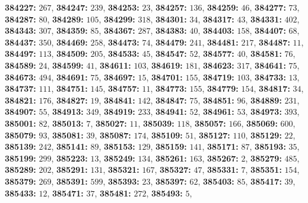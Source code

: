 \textsf{\bfseries 384227:} $267$, \textsf{\bfseries 384247:} $239$, \textsf{\bfseries 384253:} $23$, \textsf{\bfseries 384257:} $136$, \textsf{\bfseries 384259:} $46$, \textsf{\bfseries 384277:} $73$, \textsf{\bfseries 384287:} $80$, \textsf{\bfseries 384289:} $105$, \textsf{\bfseries 384299:} $318$, \textsf{\bfseries 384301:} $34$, \textsf{\bfseries 384317:} $43$, \textsf{\bfseries 384331:} $402$, \textsf{\bfseries 384343:} $307$, \textsf{\bfseries 384359:} $85$, \textsf{\bfseries 384367:} $287$, \textsf{\bfseries 384383:} $40$, \textsf{\bfseries 384403:} $158$, \textsf{\bfseries 384407:} $68$, \textsf{\bfseries 384437:} $350$, \textsf{\bfseries 384469:} $258$, \textsf{\bfseries 384473:} $74$, \textsf{\bfseries 384479:} $241$, \textsf{\bfseries 384481:} $217$, \textsf{\bfseries 384487:} $11$, \textsf{\bfseries 384497:} $113$, \textsf{\bfseries 384509:} $205$, \textsf{\bfseries 384533:} $45$, \textsf{\bfseries 384547:} $52$, \textsf{\bfseries 384577:} $40$, \textsf{\bfseries 384581:} $76$, \textsf{\bfseries 384589:} $24$, \textsf{\bfseries 384599:} $41$, \textsf{\bfseries 384611:} $103$, \textsf{\bfseries 384619:} $181$, \textsf{\bfseries 384623:} $317$, \textsf{\bfseries 384641:} $75$, \textsf{\bfseries 384673:} $494$, \textsf{\bfseries 384691:} $75$, \textsf{\bfseries 384697:} $15$, \textsf{\bfseries 384701:} $155$, \textsf{\bfseries 384719:} $103$, \textsf{\bfseries 384733:} $13$, \textsf{\bfseries 384737:} $111$, \textsf{\bfseries 384751:} $145$, \textsf{\bfseries 384757:} $11$, \textsf{\bfseries 384773:} $155$, \textsf{\bfseries 384779:} $154$, \textsf{\bfseries 384817:} $34$, \textsf{\bfseries 384821:} $176$, \textsf{\bfseries 384827:} $19$, \textsf{\bfseries 384841:} $142$, \textsf{\bfseries 384847:} $75$, \textsf{\bfseries 384851:} $96$, \textsf{\bfseries 384889:} $231$, \textsf{\bfseries 384907:} $55$, \textsf{\bfseries 384913:} $349$, \textsf{\bfseries 384919:} $233$, \textsf{\bfseries 384941:} $52$, \textsf{\bfseries 384961:} $53$, \textsf{\bfseries 384973:} $393$, \textsf{\bfseries 385001:} $82$, \textsf{\bfseries 385013:} $7$, \textsf{\bfseries 385027:} $11$, \textsf{\bfseries 385039:} $118$, \textsf{\bfseries 385057:} $166$, \textsf{\bfseries 385069:} $600$, \textsf{\bfseries 385079:} $93$, \textsf{\bfseries 385081:} $39$, \textsf{\bfseries 385087:} $174$, \textsf{\bfseries 385109:} $51$, \textsf{\bfseries 385127:} $110$, \textsf{\bfseries 385129:} $22$, \textsf{\bfseries 385139:} $242$, \textsf{\bfseries 385141:} $89$, \textsf{\bfseries 385153:} $129$, \textsf{\bfseries 385159:} $141$, \textsf{\bfseries 385171:} $87$, \textsf{\bfseries 385193:} $35$, \textsf{\bfseries 385199:} $299$, \textsf{\bfseries 385223:} $13$, \textsf{\bfseries 385249:} $134$, \textsf{\bfseries 385261:} $163$, \textsf{\bfseries 385267:} $2$, \textsf{\bfseries 385279:} $485$, \textsf{\bfseries 385289:} $202$, \textsf{\bfseries 385291:} $131$, \textsf{\bfseries 385321:} $167$, \textsf{\bfseries 385327:} $47$, \textsf{\bfseries 385331:} $7$, \textsf{\bfseries 385351:} $154$, \textsf{\bfseries 385379:} $269$, \textsf{\bfseries 385391:} $599$, \textsf{\bfseries 385393:} $23$, \textsf{\bfseries 385397:} $62$, \textsf{\bfseries 385403:} $85$, \textsf{\bfseries 385417:} $39$, \textsf{\bfseries 385433:} $12$, \textsf{\bfseries 385471:} $37$, \textsf{\bfseries 385481:} $272$, \textsf{\bfseries 385493:} $5$, 

